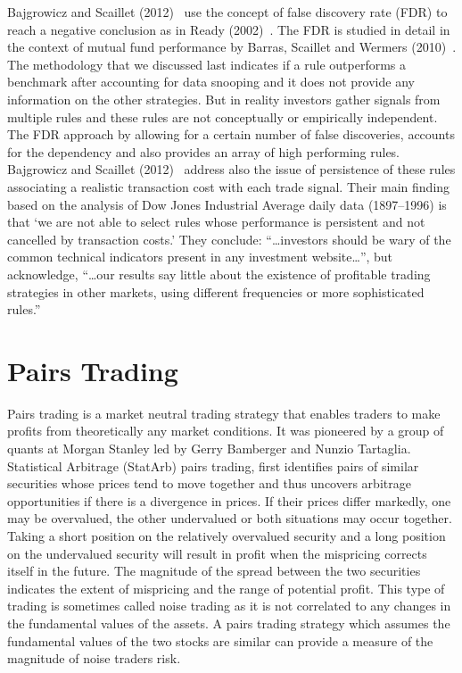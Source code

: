 Bajgrowicz and Scaillet (2012)~\cite{bajgrowicz2012technical} use the concept of false discovery rate (FDR) to reach a negative conclusion as in Ready (2002)~\cite{ready}. The FDR is studied in detail in the context of mutual fund performance by Barras, Scaillet and Wermers (2010)~\cite{barras2010false}. The methodology that we discussed last indicates if a rule outperforms a benchmark after accounting for data snooping and it does not provide any information on the other strategies. But in reality investors gather signals from multiple rules and these rules are not conceptually or empirically independent. The FDR approach by allowing for a certain number of false discoveries, accounts for the dependency and also provides an array of high performing rules. Bajgrowicz and Scaillet (2012)~\cite{bajgrowicz2012technical} address also the issue of persistence of these rules associating a realistic transaction cost with each trade signal. Their main finding based on the analysis of Dow Jones Industrial Average daily data (1897--1996) is that `we are not able to select rules whose performance is persistent and not cancelled by transaction costs.' They conclude: ``\dots investors should be wary of the common technical indicators present in any investment website\dots'', but acknowledge, ``\dots our results say little about the existence of profitable trading strategies in other markets, using different frequencies or more sophisticated rules.''



\section{Pairs Trading}


Pairs trading is a market neutral trading strategy that enables traders to make profits from theoretically any market conditions. It was pioneered by a group of quants at Morgan Stanley led by Gerry Bamberger and Nunzio Tartaglia. Statistical Arbitrage (StatArb) pairs trading, first identifies pairs of similar securities whose prices tend to move together and thus uncovers arbitrage opportunities if there is a divergence in prices. If their prices differ markedly, one may be overvalued, the other undervalued or both situations may occur together. Taking a short position on the relatively overvalued security and a long position on the undervalued security will result in profit when the mispricing corrects itself in the future. The magnitude of the spread between the two securities indicates the extent of mispricing and the range of potential profit. This type of trading is sometimes called noise trading as it is not correlated to any changes in the fundamental values of the assets. A pairs trading strategy which assumes the fundamental values of the two stocks are similar can provide a measure of the magnitude of noise traders risk.


